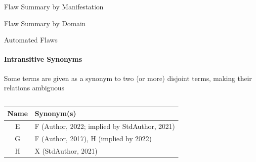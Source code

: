 \begin{frame}{Flaw Summary by Manifestation}
    \begin{center}
        \hspace{18cm}\vspace*{-8mm}
    \end{center}
\end{frame}

\begin{frame}{Flaw Summary by Domain}
    \begin{center}
        
    \end{center}
\end{frame}

\begin{frame}{Automated Flaws}
    \framesubtitle{Intransitive Synonyms}
    Some terms are given as a synonym to two (or more) disjoint terms, making
    their relations ambiguous
    \vspace{-0.5cm}
    \begin{columns}[c]
        \begin{column}{.475\linewidth}
            \small
            \begin{table}[hbtp!]
                \centering
                \begin{tabularx}{\textwidth}{c>{\raggedleft\arraybackslash}X} \hline
                    Name & Synonym(s)                                   \\ \hline
                    E    & F (Author, 2022; implied by StdAuthor, 2021) \\
                    G    & F (Author, 2017), H (implied by 2022)        \\
                    H    & X (StdAuthor, 2021)                          \\ \hline
                \end{tabularx}
            \end{table}
        \end{column}
        \begin{column}{.5\linewidth}

\end{column}
\end{columns}
\end{frame}
